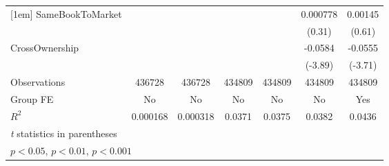 {\begin{tabular}{l*{6}{c}}
[1em]
SameBookToMarket&                  &                  &                  &                  & 0.000778         &  0.00145         \\
                &                  &                  &                  &                  &   (0.31)         &   (0.61)         \\
[1em]
CrossOwnership  &                  &                  &                  &                  &  -0.0584\sym{***}&  -0.0555\sym{***}\\
                &                  &                  &                  &                  &  (-3.89)         &  (-3.71)         \\
\hline
Observations    &   436728         &   436728         &   434809         &   434809         &   434809         &   434809         \\
Group FE        &       No         &       No         &       No         &       No         &       No         &      Yes         \\
$ R^2 $         & 0.000168         & 0.000318         &   0.0371         &   0.0375         &   0.0382         &   0.0436         \\
\hline\hline
\multicolumn{7}{l}{\footnotesize \textit{t} statistics in parentheses}\\
\multicolumn{7}{l}{\footnotesize \sym{*} \(p<0.05\), \sym{**} \(p<0.01\), \sym{***} \(p<0.001\)}\\
\end{tabular}
}
